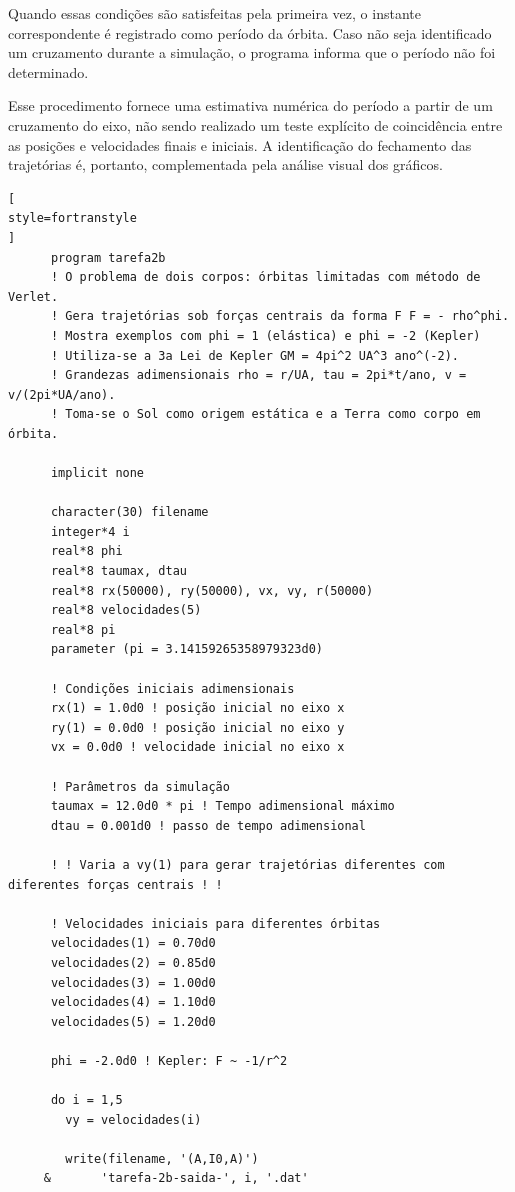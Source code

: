 \documentclass[12pt,a4paper]{article}
\begin{document}
Quando essas condições são satisfeitas pela primeira vez, o instante correspondente é registrado como período da órbita. Caso não seja identificado um cruzamento durante a simulação, o programa informa que o período não foi determinado.

Esse procedimento fornece uma estimativa numérica do período a partir de um cruzamento do eixo, não sendo realizado um teste explícito de coincidência entre as posições e velocidades finais e iniciais. A identificação do fechamento das trajetórias é, portanto, complementada pela análise visual dos gráficos.

\begin{lstlisting}[
style=fortranstyle
]
      program tarefa2b
      ! O problema de dois corpos: órbitas limitadas com método de Verlet.
      ! Gera trajetórias sob forças centrais da forma F F = - rho^phi.
      ! Mostra exemplos com phi = 1 (elástica) e phi = -2 (Kepler)
      ! Utiliza-se a 3a Lei de Kepler GM = 4pi^2 UA^3 ano^(-2).
      ! Grandezas adimensionais rho = r/UA, tau = 2pi*t/ano, v = v/(2pi*UA/ano).
      ! Toma-se o Sol como origem estática e a Terra como corpo em órbita.

      implicit none

      character(30) filename
      integer*4 i
      real*8 phi
      real*8 taumax, dtau
      real*8 rx(50000), ry(50000), vx, vy, r(50000)
      real*8 velocidades(5)
      real*8 pi
      parameter (pi = 3.14159265358979323d0)

      ! Condições iniciais adimensionais
      rx(1) = 1.0d0 ! posição inicial no eixo x
      ry(1) = 0.0d0 ! posição inicial no eixo y
      vx = 0.0d0 ! velocidade inicial no eixo x

      ! Parâmetros da simulação
      taumax = 12.0d0 * pi ! Tempo adimensional máximo
      dtau = 0.001d0 ! passo de tempo adimensional

      ! ! Varia a vy(1) para gerar trajetórias diferentes com diferentes forças centrais ! !

      ! Velocidades iniciais para diferentes órbitas
      velocidades(1) = 0.70d0
      velocidades(2) = 0.85d0
      velocidades(3) = 1.00d0
      velocidades(4) = 1.10d0
      velocidades(5) = 1.20d0

      phi = -2.0d0 ! Kepler: F ~ -1/r^2

      do i = 1,5
        vy = velocidades(i)

        write(filename, '(A,I0,A)')
     &       'tarefa-2b-saida-', i, '.dat'


\end{lstlisting}
\end{document}
